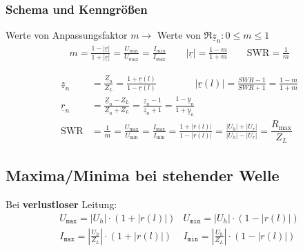 \subsubsection{Schema und Kenngrößen}
\begin{center}
	
\end{center}

Werte von Anpassungsfaktor $ m \rightarrow$ Werte von
$ \Re{\underline{z}_n}: 0 \leq m \leq1 $
\begin{align*}
	m =\frac{1-|\underline{r}|}{1+|\underline{r}|} = \frac{U_{min}}{U_{max}} = \frac{I_{min}}{I_{max}} \qquad  |\underline{r}| = \frac{1-m}{1+m} \qquad \text{SWR}=\frac{1}{m}
\end{align*}

\begin{align*}
	\underline{z}_n & = \frac{\underline{Z}_n}{Z_L} = \frac{1+\underline{r}(l)}{1-\underline{r}(l)} \qquad \qquad |\underline{r}(l)|=\frac{\si{SWR}-1}{\si{SWR}+1} = \frac{1-m}{1+m}                   \\
	\underline{r}_n & = \frac{\underline{Z}_n-Z_L}{\underline{Z}_n+Z_L}= \frac{\underline{z}_n-1}{\underline{z}_n+1}    = \frac{1-\underline{y}_n}{1+\underline{y}_n}                                  \\
	\mathrm{SWR}    & = \frac{1}{m} = \frac{U_\text{max}}{U_\text{min}} = \frac{I_\text{max}}{I_\text{min}} = \frac{1+|r(l)|}{1-|r(l)|} = \frac{|U_h|+|U_r|}{|U_h|-|U_r|}= \dfrac{R_{\text{max}}}{Z_L}
\end{align*}

\subsection{Maxima/Minima bei stehender Welle}\label{sec:max_min_stehende_welle}
Bei \textbf{verlustloser} Leitung:
\begin{align*}
	 & U_{\texttt{max}} = |U_h| \cdot (1+|r(l)|)                            & U_{\texttt{min}} = |U_h| \cdot (1-|r(l)|)                           & \\
	 & I_{\texttt{max}} = \left | \frac{U_h}{Z_L} \right | \cdot (1+|r(l)|) & I_{\texttt{min}} = \left| \frac{U_h}{Z_L} \right | \cdot (1-|r(l)|) &
\end{align*}

